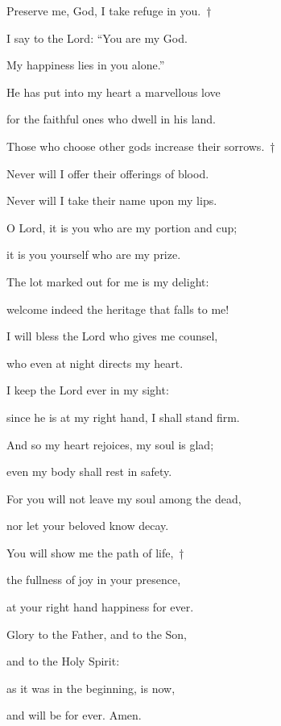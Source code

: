 \noindent Preserve me, God, I take refuge in you.~†~\nopagebreak

I say to the Lord: “You are my God. ~\GreStar{}~\nopagebreak

My happiness lies in you alone.”

\noindent He has put into my heart a marvellous love ~\GreStar{}~\nopagebreak

for the faithful ones who dwell in his land.

\noindent Those who choose other gods increase their sorrows.~†~\nopagebreak

Never will I offer their offerings of blood. ~\GreStar{}~\nopagebreak

Never will I take their name upon my lips.

\noindent O Lord, it is you who are my portion and cup; ~\GreStar{}~\nopagebreak

it is you yourself who are my prize.

\noindent The lot marked out for me is my delight: ~\GreStar{}~\nopagebreak

welcome indeed the heritage that falls to me!

\noindent I will bless the Lord who gives me counsel, ~\GreStar{}~\nopagebreak

who even at night directs my heart.

\noindent I keep the Lord ever in my sight: ~\GreStar{}~\nopagebreak

since he is at my right hand, I shall stand firm.

\noindent And so my heart rejoices, my soul is glad; ~\GreStar{}~\nopagebreak

even my body shall rest in safety.

\noindent For you will not leave my soul among the dead, ~\GreStar{}~\nopagebreak

nor let your beloved know decay.

\noindent You will show me the path of life,~†~\nopagebreak

the fullness of joy in your presence, ~\GreStar{}~\nopagebreak

at your right hand happiness for ever.

\noindent Glory to the Father, and to the Son,~\GreStar{}~\nopagebreak

and to the Holy Spirit:

\noindent as it was in the beginning, is now,~\GreStar{}~\nopagebreak

and will be for ever. Amen.

